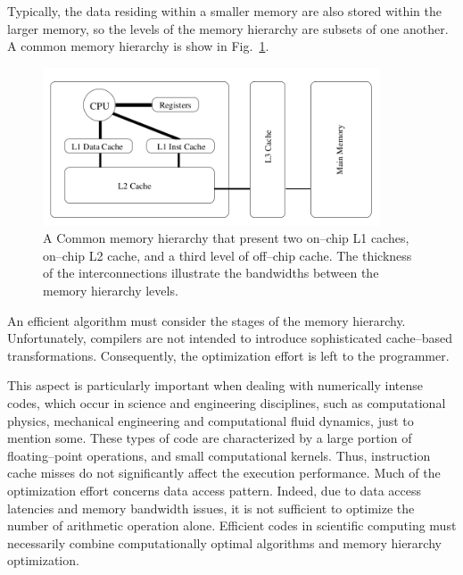 Typically, the data residing within a smaller memory are also stored within the larger memory, so the levels of the memory hierarchy are subsets of one another. A common memory hierarchy is show in Fig.~\ref{fig:memory-hierarchy}.
\begin{figure}
   \centering
   \includegraphics[width=10cm]{Figs/Memory_hierarchy.png}
   \caption{A Common memory hierarchy that present two on--chip L1 caches, on--chip L2 cache, and a third level of off--chip cache. The thickness of the interconnections illustrate the bandwidths between the memory hierarchy levels.} \label{fig:memory-hierarchy}
\end{figure} 

An efficient algorithm must consider the stages of the memory hierarchy. Unfortunately, compilers are not intended to introduce sophisticated cache--based transformations. Consequently, the optimization effort is left to the programmer. 

This aspect is particularly important when dealing with numerically intense codes, which occur in science and engineering disciplines, such as computational physics, mechanical engineering and computational fluid dynamics, just to mention some. These types of code are characterized by a large portion of floating--point operations, and small computational kernels. Thus, instruction cache misses do not significantly affect the execution performance. Much of the optimization effort concerns data access pattern. Indeed, due to data access latencies and memory bandwidth issues, it is not sufficient to optimize the number of arithmetic operation alone. Efficient codes in scientific computing must necessarily combine computationally optimal algorithms and memory hierarchy optimization.

